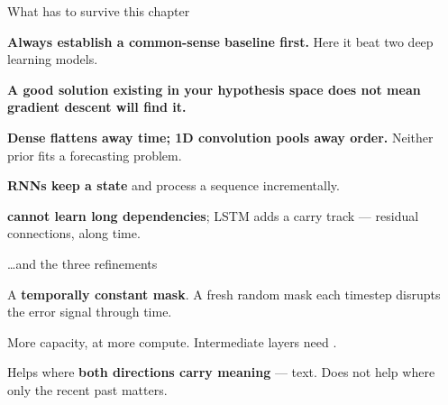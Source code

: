 \documentclass[aspectratio=169,11pt,t]{beamer}
\begin{document}
\begin{frame}[shrink=25]{What has to survive this chapter}
\begin{isteps}
\item \textbf{Always establish a common-sense baseline first.} Here it beat two deep learning models.
\item \textbf{A good solution existing in your hypothesis space does not mean gradient descent will find it.}
\item \textbf{Dense flattens away time; 1D convolution pools away order.} Neither prior fits a forecasting problem.
\item \textbf{RNNs keep a state} and process a sequence incrementally.
\item \textbf{ cannot learn long dependencies}; LSTM adds a carry track --- residual connections, along time.
\end{isteps}
\end{frame}

\begin{frame}[shrink=25]{\ldots{}and the three refinements}
\begin{minipage}[t]{0.3253\textwidth}
\begin{icardaccent}
A \textbf{temporally constant mask}. A fresh random mask each timestep disrupts the error signal through time.
\end{icardaccent}
\end{minipage}%
\hfill
\begin{minipage}[t]{0.3253\textwidth}
\begin{icardaccent}
More capacity, at more compute. Intermediate layers need .
\end{icardaccent}
\end{minipage}%
\hfill
\begin{minipage}[t]{0.3253\textwidth}
\begin{icardaccent}
Helps where \textbf{both directions carry meaning} --- text. Does not help where only the recent past matters.
\end{icardaccent}
\end{minipage}%
\vskip 4pt
\vskip 2pt
\end{frame}
\end{document}
